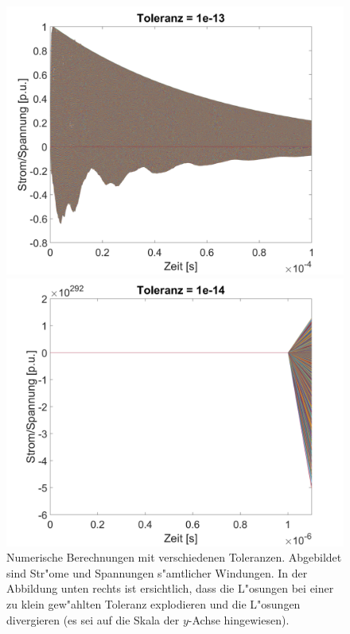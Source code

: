 \begin{refsection}
\begin{figure}
\begin{minipage}{.5\textwidth}
	        \includegraphics[width=\linewidth]{./trafo/images/svd13.png}
	    \end{minipage}%
	    \begin{minipage}{.5\textwidth}
	        \centering
	        \includegraphics[width=\linewidth]{./trafo/images/svd14.png}
	    \end{minipage}
	    \caption{Numerische Berechnungen mit verschiedenen Toleranzen. Abgebildet sind Str"ome und Spannungen s"amtlicher Windungen. In der Abbildung unten rechts ist ersichtlich, dass die L"osungen bei einer zu klein gew"ahlten Toleranz explodieren und die L"osungen divergieren (es sei auf die Skala der $y$-Achse hingewiesen). }
	    \label{trafo:SVDTol}
	\end{figure}


\end{refsection}
